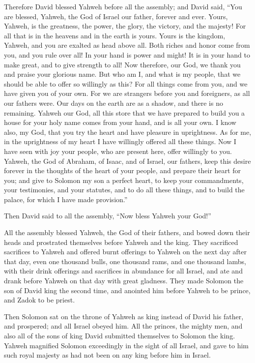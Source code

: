  Therefore David blessed Yahweh before all the assembly;
and David said, ``You are blessed, Yahweh, the God of Israel our father,
forever and ever.  Yours, Yahweh, is the greatness, the
power, the glory, the victory, and the majesty! For all that is in the
heavens and in the earth is yours. Yours is the kingdom, Yahweh, and you
are exalted as head above all.  Both riches and honor come
from you, and you rule over all! In your hand is power and might! It is
in your hand to make great, and to give strength to all! 
Now therefore, our God, we thank you and praise your glorious name.
 But who am I, and what is my people, that we should be
able to offer so willingly as this? For all things come from you, and we
have given you of your own.  For we are strangers before
you and foreigners, as all our fathers were. Our days on the earth are
as a shadow, and there is no remaining.  Yahweh our God,
all this store that we have prepared to build you a house for your holy
name comes from your hand, and is all your own.  I know
also, my God, that you try the heart and have pleasure in uprightness.
As for me, in the uprightness of my heart I have willingly offered all
these things. Now I have seen with joy your people, who are present
here, offer willingly to you.  Yahweh, the God of Abraham,
of Isaac, and of Israel, our fathers, keep this desire forever in the
thoughts of the heart of your people, and prepare their heart for you;
 and give to Solomon my son a perfect heart, to keep your
commandments, your testimonies, and your statutes, and to do all these
things, and to build the palace, for which I have made provision.''

 Then David said to all the assembly, ``Now bless Yahweh
your God!''

All the assembly blessed Yahweh, the God of their fathers, and bowed
down their heads and prostrated themselves before Yahweh and the king.
 They sacrificed sacrifices to Yahweh and offered burnt
offerings to Yahweh on the next day after that day, even one thousand
bulls, one thousand rams, and one thousand lambs, with their drink
offerings and sacrifices in abundance for all Israel,  and
ate and drank before Yahweh on that day with great gladness. They made
Solomon the son of David king the second time, and anointed him before
Yahweh to be prince, and Zadok to be priest.

 Then Solomon sat on the throne of Yahweh as king instead
of David his father, and prospered; and all Israel obeyed him.
 All the princes, the mighty men, and also all of the sons
of king David submitted themselves to Solomon the king. 
Yahweh magnified Solomon exceedingly in the sight of all Israel, and
gave to him such royal majesty as had not been on any king before him in
Israel.


